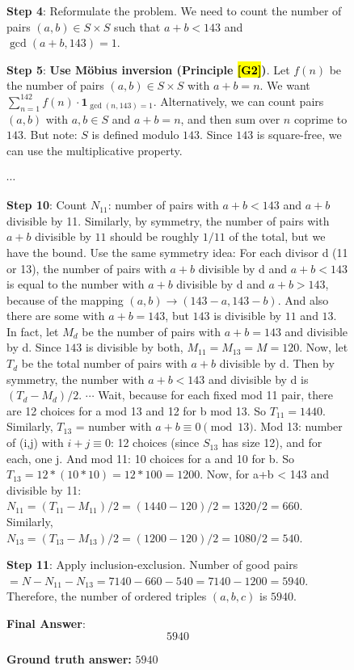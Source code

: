 \documentclass{article}
\theoremstyle{plain}
\theoremstyle{definition}
\theoremstyle{remark}
\begin{document}
\begin{figure}[!tb]
\begin{runcard}[title={Example of How E-SPL Shapes Model Behavior}]
\begin{runbox}[title={Model Output}]
\textbf{Step 4}: Reformulate the problem. We need to count the number of pairs \( (a, b) \in S \times S \) such that \( a + b < 143 \) and \( \gcd(a+b, 143) = 1 \).

\medskip
\textbf{Step 5}: {\color{Brown}\textbf{Use Möbius inversion (Principle \hl{[G2]})}. Let \( f(n) \) be the number of pairs \( (a, b) \in S \times S \) with \( a + b = n \). We want \( \sum_{n=1}^{142} f(n) \cdot \mathbf{1}_{\gcd(n,143)=1} \). Alternatively, we can count pairs \( (a, b) \) with \( a, b \in S \) and \( a + b = n \), and then sum over \( n \) coprime to $143$. But note: \( S \) is defined modulo $143$. Since $143$ is square-free, we can use the multiplicative property.}

\quad $\cdots$

\textbf{Step 10}: Count \( N_{11} \): number of pairs with \( a+b < 143 \) and \( a+b \) divisible by 11. Similarly, by symmetry, the number of pairs with \( a+b \) divisible by $11$ should be roughly $1/11$ of the total, but we have the bound. Use the same symmetry idea: For each divisor d (11 or 13), the number of pairs with \( a+b \) divisible by d and \( a+b < 143 \) is equal to the number with \( a+b \) divisible by d and \( a+b > 143 \), because of the mapping \( (a,b) \to (143-a,143-b) \). And also there are some with \( a+b = 143 \), but $143$ is divisible by $11$ and $13$. In fact, let \( M_d \) be the number of pairs with \( a+b = 143 \) and divisible by d. Since $143$ is divisible by both, \( M_{11} = M_{13} = M = 120 \). Now, let \( T_d \) be the total number of pairs with \( a+b \) divisible by d. Then by symmetry, the number with \( a+b < 143 \) and divisible by d is \( (T_d - M_d)/2 \). \quad $\cdots$ \quad Wait, because for each fixed mod 11 pair, there are 12 choices for a mod 13 and 12 for b mod 13. So $T_{11} = 1440$. Similarly, $T_{13}$ = number with $a+b \equiv 0 \pmod{13}$. Mod 13: number of (i,j) with $i+j\equiv 0$: 12 choices (since $S_{13}$ has size 12), and for each, one j. And mod 11: 10 choices for a and 10 for b. So $T_{13} = 12 * (10*10) = 12*100 = 1200$. Now, for a+b < 143 and divisible by 11: $N_{11} = (T_{11} - M_{11})/2 = (1440 - 120)/2 = 1320/2 = 660$. Similarly, $N_{13} = (T_{13} - M_{13})/2 = (1200 - 120)/2 = 1080/2 = 540$.

\textbf{Step 11}: Apply inclusion-exclusion. Number of good pairs $= N - N_{11} - N_{13} = 7140 - 660 - 540 = 7140 - 1200 = 5940$. Therefore, the number of ordered triples $(a,b,c)$ is $5940$.

\medskip
\textbf{Final Answer}:
\[
\boxed{5940}
\]

\end{runbox}

\textbf{Ground truth answer:} $5940$
\end{runcard}
\label{fig:example-e-spl-4}

\end{figure}
\end{document}
